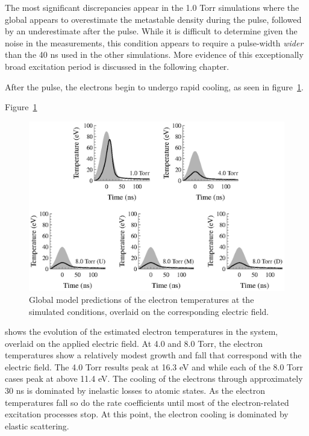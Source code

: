 The most significant discrepancies appear in the 1.0 Torr simulations where the
global appears to overestimate the metastable density during the pulse, followed
by an underestimate after the pulse. While it is difficult to determine given
the noise in the measurements, this condition appears to require a pulse-width
\emph{wider} than the 40 ns used in the other simulations. More evidence of this
exceptionally broad excitation period is discussed in the following chapter.

After the pulse, the electrons begin to undergo rapid cooling, as seen in
figure~\ref{fig:etemps}.

Figure~\ref{fig:etemps}
\begin{figure}
  \centering
  \includegraphics{./chapters/modeling/figures/etemps.eps}
  \caption{Global model predictions of the electron temperatures at the
  simulated conditions, overlaid on the corresponding electric field.}
  \label{fig:etemps}
\end{figure}
shows the evolution of the estimated electron temperatures in the system,
overlaid on the applied electric field. At 4.0 and 8.0 Torr, the electron
temperatures show a relatively modest growth and fall that correspond with the
electric field. The 4.0 Torr results peak at 16.3 eV and while each of the 8.0
Torr cases peak at above 11.4 eV. The cooling of the electrons through
approximately 30 ns is dominated by inelastic losses to atomic states. As the
electron temperatures fall so do the rate coefficients until most of the
electron-related excitation processes stop. At this point, the electron cooling
is dominated by elastic scattering.

